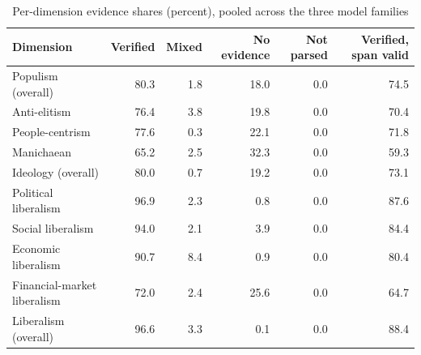 \begin{table}[ht]
\centering
\caption{Per-dimension evidence shares (percent), pooled across the three model families}
\label{tab:evidence_shares}
\footnotesize
\begin{tabular}{lrrrrr}
\toprule
Dimension & Verified & Mixed & No evidence & Not parsed & Verified, span valid \\
\midrule
Populism (overall)            & 80.3 & 1.8 & 18.0 & 0.0 & 74.5 \\
Anti-elitism                  & 76.4 & 3.8 & 19.8 & 0.0 & 70.4 \\
People-centrism               & 77.6 & 0.3 & 22.1 & 0.0 & 71.8 \\
Manichaean                    & 65.2 & 2.5 & 32.3 & 0.0 & 59.3 \\
Ideology (overall)            & 80.0 & 0.7 & 19.2 & 0.0 & 73.1 \\
Political liberalism          & 96.9 & 2.3 & 0.8 & 0.0 & 87.6 \\
Social liberalism             & 94.0 & 2.1 & 3.9 & 0.0 & 84.4 \\
Economic liberalism           & 90.7 & 8.4 & 0.9 & 0.0 & 80.4 \\
Financial-market liberalism   & 72.0 & 2.4 & 25.6 & 0.0 & 64.7 \\
Liberalism (overall)          & 96.6 & 3.3 & 0.1 & 0.0 & 88.4 \\
\bottomrule
\end{tabular}
\end{table}
